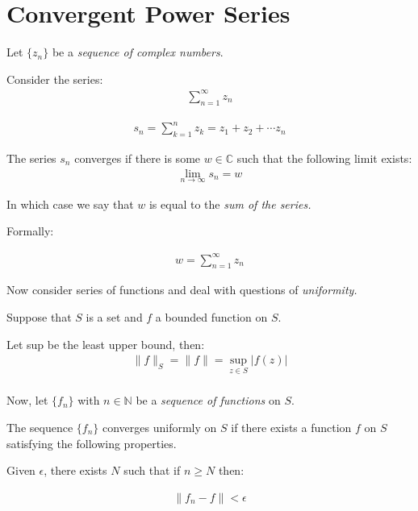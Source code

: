 \section{Convergent Power Series}
Let ${ \{ z_n \} }$ be a \emph{sequence of complex numbers}.

Consider the series:
\begin{align*}
  \sum_{n = 1}^{\infty} z_n
\end{align*}

\begin{defn}
  \begin{align*}
    s_n = \sum_{k = 1}^{n} z_k = z_1 + z_2 + \cdots z_n
  \end{align*}
\end{defn}

\begin{defn}
  The series $s_n$ converges if there is some $w \in \mathbb{C}$ such that the following limit exists:
  \begin{align*}
    \lim_{n \to \infty}s_n = w
  \end{align*}
\end{defn}

In which case we say that $w$ is equal to the \emph{sum of the series.}

Formally:

\begin{defn}
  \begin{align*}
    w = \sum_{n = 1}^{\infty} z_n
  \end{align*}
\end{defn}

Now consider series of functions and deal with questions of \emph{uniformity.}

Suppose that $S$ is a set and $f$ a bounded function on $S$.

\begin{defn}
  Let sup be the least upper bound, then:
  \begin{align*}
    \| f \|_S = \| f \| = \sup_{z \in S} | f(z) | \\
  \end{align*}
\end{defn}

Now, let $\{ f_n \}$ with $n \in \mathbb{N}$ be a \emph{sequence of functions} on $S$.

\begin{defn}
  The sequence $ \{ f_n \}$ converges uniformly on $S$ if there exists a 
  function $f$ on $S$ satisfying the following properties.

  Given $\epsilon$, there exists $N$ such that if $n \geq N$ then:

  \begin{align*}
    \| f_n - f \| < \epsilon \\
  \end{align*}
\end{defn}

